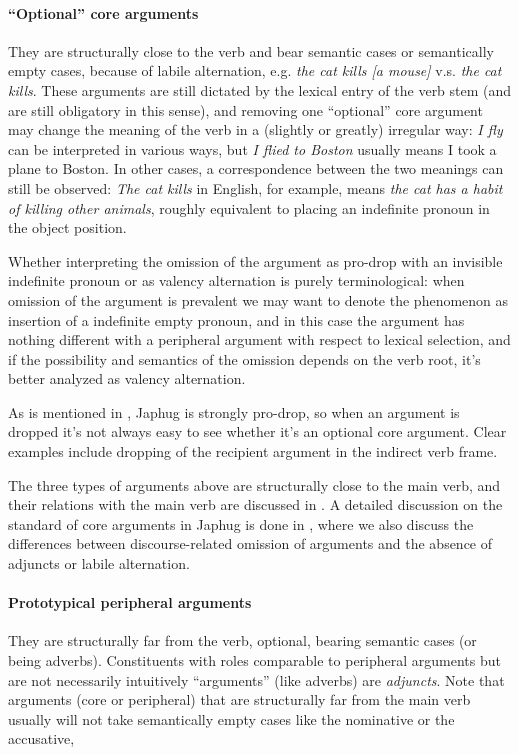\documentclass[a4paper, oneside, 12pt]{report}
\newcommand*{\term}[1]{\emph{#1}}
\newcommand{\form}[1]{\emph{#1}}
\begin{document}
\paragraph*{``Optional'' core arguments}\label{sec:grammatical.clause.internal.optional-core}
They are structurally close to the verb and bear semantic cases or semantically empty cases,
because of labile alternation,
e.g. \form{the cat kills [a mouse]} v.s. \form{the cat kills}.
These arguments are still dictated by the lexical entry of the verb stem
(and are still obligatory in this sense),
and removing one ``optional''  core argument
may change the meaning of the verb in a (slightly or greatly) irregular way:
\form{I fly} can be interpreted in various ways,
but \form{I flied to Boston} usually means I took a plane to Boston.
In other cases, a correspondence between the two meanings can still be observed:
\form{The cat kills} in English, for example, 
means \form{the cat has a habit of killing other animals},
roughly equivalent to placing an indefinite pronoun in the object position.

Whether interpreting the omission of the argument
as pro-drop with an invisible indefinite pronoun
or as valency alternation is purely terminological:
when omission of the argument is prevalent we may want to 
denote the phenomenon as insertion of a indefinite empty pronoun,
and in this case the argument has nothing different with a peripheral argument with respect to lexical selection,
and if the possibility and semantics of the omission depends on the verb root,
it's better analyzed as valency alternation.

As is mentioned in ,
Japhug is strongly pro-drop,
so when an argument is dropped it's not always easy to see whether it's an optional core argument.
Clear examples include dropping of the recipient argument in the indirect verb frame.

The three types of arguments above are structurally close to the main verb,
and their relations with the main verb are discussed in .
A detailed discussion on the standard of core arguments in Japhug
is done in ,
where we also discuss the differences between discourse-related omission of arguments
and the absence of adjuncts or labile alternation.

\paragraph*{Prototypical peripheral arguments}
They are structurally far from the verb,
optional, bearing semantic cases (or being adverbs).
Constituents with roles comparable to peripheral arguments 
but are not necessarily intuitively ``arguments'' (like adverbs)
are \term{adjuncts}.
Note that arguments (core or peripheral) that are structurally far from the main verb
usually will not take semantically empty cases like the nominative or the accusative,%
\end{document}
